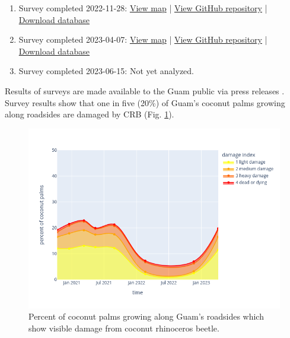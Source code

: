 \documentclass[12pt,letterpaper,english,bibliography=totocnumbered, abstract=on]{scrartcl}
\begin{document}
\begin{enumerate}
	\item Survey completed 2022-11-28: 
	\href{https://aubreymoore.github.io/Guam-CRB-Damage-Map-2022-11/webmap/#11/13.4483/144.7860}{View map} | 
	\href{https://github.com/aubreymoore/Guam-CRB-Damage-Map-2022-11}{View GitHub repository} | 
	\href{https://github.com/aubreymoore/Guam-CRB-Damage-Map-2022-11/raw/main/output/Guam07.db}{Download database}
	
	\item Survey completed 2023-04-07:  
	\href{https://aubreymoore.github.io/Guam-CRB-Damage-Map-2023-04/webmap/#11/13.4483/144.7860}{View map} | 
	\href{https://github.com/aubreymoore/Guam-CRB-Damage-Map-2023-04}{View GitHub repository} | 
	\href{https://github.com/aubreymoore/Guam-CRB-Damage-Map-2023-04/raw/main/output/results.db}{Download database}
	
	\item Survey completed 2023-06-15: Not yet analyzed.
	
\end{enumerate}

Results of surveys are made available to the Guam public via press releases \cite{moorePressRelease2023}. Survey results show that one in five (20\%) of Guam's coconut palms growing along roadsides are damaged by CRB (Fig. \ref{fig:timeline}).

\begin{figure}[H]
	\centering
	\includegraphics[width=1\linewidth]{../images/timeline}
	\caption{Percent of coconut palms growing along Guam's roadsides which show visible damage from coconut rhinoceros beetle.}
	\label{fig:timeline}
\end{figure}
\end{document}
